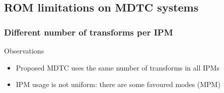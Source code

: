 \documentclass[10pt]{beamer} %
\makeatletter
\newcommand*{\currentname}{\@currentlabelname}
\makeatother
\begin{document}

\subsection{ROM limitations on MDTC systems}

\subsubsection{Different number of transforms per IPM}

\begin{frame}{\currentname}
	\begin{block}{Observations}
		\begin{itemize}
			\item Proposed MDTC uses the same number of transforms in all IPMs
			\item IPM usage is not uniform: there are some favoured modes
				(MPM)
		\end{itemize}
	\end{block}
	
\end{frame}
\end{document}
